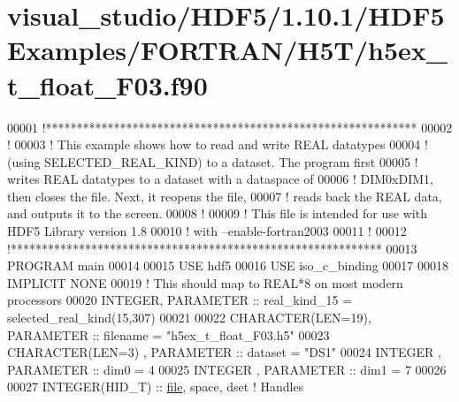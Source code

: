 \hypertarget{visual__studio_2_h_d_f5_21_810_81_2_h_d_f5_examples_2_f_o_r_t_r_a_n_2_h5_t_2h5ex__t__float___f03_8f90_source}{}\section{visual\+\_\+studio/\+H\+D\+F5/1.10.1/\+H\+D\+F5\+Examples/\+F\+O\+R\+T\+R\+A\+N/\+H5\+T/h5ex\+\_\+t\+\_\+float\+\_\+\+F03.f90}
\label{visual__studio_2_h_d_f5_21_810_81_2_h_d_f5_examples_2_f_o_r_t_r_a_n_2_h5_t_2h5ex__t__float___f03_8f90_source}

\begin{DoxyCode}
00001 \textcolor{comment}{!************************************************************}
00002 \textcolor{comment}{!}
00003 \textcolor{comment}{!  This example shows how to read and write REAL datatypes}
00004 \textcolor{comment}{!  (using SELECTED\_REAL\_KIND) to a dataset.  The program first }
00005 \textcolor{comment}{!  writes REAL datatypes to a dataset with a dataspace of }
00006 \textcolor{comment}{!  DIM0xDIM1, then closes the file.  Next, it reopens the file, }
00007 \textcolor{comment}{!  reads back the REAL data, and outputs it to the screen.}
00008 \textcolor{comment}{!}
00009 \textcolor{comment}{!  This file is intended for use with HDF5 Library version 1.8}
00010 \textcolor{comment}{!  with --enable-fortran2003}
00011 \textcolor{comment}{!}
00012 \textcolor{comment}{!************************************************************}
00013 \textcolor{keyword}{PROGRAM} main
00014 
00015   \textcolor{keywordtype}{USE }hdf5
00016   \textcolor{keywordtype}{USE }iso\_c\_binding
00017 
00018   \textcolor{keywordtype}{IMPLICIT NONE}
00019   \textcolor{comment}{! This should map to REAL*8 on most modern processors}
00020   \textcolor{keywordtype}{INTEGER}, \textcolor{keywordtype}{PARAMETER} :: real\_kind\_15 = selected\_real\_kind(15,307)
00021 
00022   \textcolor{keywordtype}{CHARACTER(LEN=19)}, \textcolor{keywordtype}{PARAMETER} :: filename  = \textcolor{stringliteral}{"h5ex\_t\_float\_F03.h5"}
00023   \textcolor{keywordtype}{CHARACTER(LEN=3)} , \textcolor{keywordtype}{PARAMETER} :: dataset   = \textcolor{stringliteral}{"DS1"}
00024   \textcolor{keywordtype}{INTEGER}          , \textcolor{keywordtype}{PARAMETER} :: dim0      = 4
00025   \textcolor{keywordtype}{INTEGER}          , \textcolor{keywordtype}{PARAMETER} :: dim1      = 7
00026 
00027   \textcolor{keywordtype}{INTEGER(HID\_T)}  :: \hyperlink{structfile}{file}, space, dset \textcolor{comment}{! Handles}

\end{DoxyCode}
